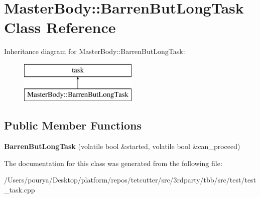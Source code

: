 \hypertarget{classMasterBody_1_1BarrenButLongTask}{}\section{Master\+Body\+:\+:Barren\+But\+Long\+Task Class Reference}
\label{classMasterBody_1_1BarrenButLongTask}
Inheritance diagram for Master\+Body\+:\+:Barren\+But\+Long\+Task\+:\begin{figure}[H]
\begin{center}
\leavevmode
\includegraphics[height=2.000000cm]{classMasterBody_1_1BarrenButLongTask}
\end{center}
\end{figure}
\subsection*{Public Member Functions}
\begin{DoxyCompactItemize}
\item 
\hypertarget{classMasterBody_1_1BarrenButLongTask_ad34e9236786350c2151f62440efe2d60}{}{\bfseries Barren\+But\+Long\+Task} (volatile bool \&started, volatile bool \&can\+\_\+proceed)\label{classMasterBody_1_1BarrenButLongTask_ad34e9236786350c2151f62440efe2d60}

\end{DoxyCompactItemize}


The documentation for this class was generated from the following file\+:\begin{DoxyCompactItemize}
\item 
/\+Users/pourya/\+Desktop/platform/repos/tetcutter/src/3rdparty/tbb/src/test/test\+\_\+task.\+cpp\end{DoxyCompactItemize}
